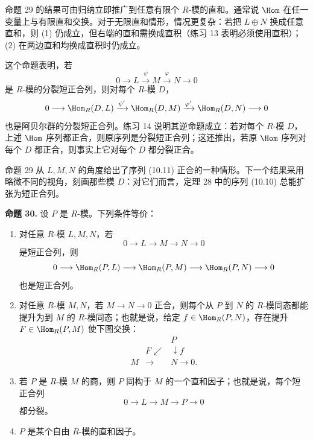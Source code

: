 命题 29 的结果可由归纳立即推广到任意有限个 $R$-模的直和。通常说 $\Hom$ 在任一变量上与有限直和交换。对于无限直和情形，情况更复杂：若把 $L\oplus N$ 换成任意直和，则 (1) 仍成立，但右端的直和需换成直积（练习 13 表明必须使用直积）；(2) 在两边直和均换成直积时仍成立。

这个命题表明，若
\[
0\longrightarrow L\xrightarrow{\psi}M\xrightarrow{\varphi}N\longrightarrow0
\]
是 $R$-模的分裂短正合列，则对每个 $R$-模 $D$，
\[
0\longrightarrow\Hom_R(D,L)\xrightarrow{\psi'}\Hom_R(D,M)\xrightarrow{\varphi'}\Hom_R(D,N)\longrightarrow0
\]
也是阿贝尔群的分裂短正合列。练习 14 说明其逆命题成立：若对每个 $R$-模 $D$，上述 $\Hom$ 序列都正合，则原序列是分裂短正合列；这还推出，若原 $\Hom$ 序列对每个 $D$ 都正合，则事实上它对每个 $D$ 都分裂正合。

命题 29 从 $L,M,N$ 的角度给出了序列 (10.11) 正合的一种情形。下一个结果采用略微不同的视角，刻画那些模 $D$：对它们而言，定理 28 中的序列 (10.10) 总能扩张为短正合列。

\noindent\textbf{命题 30.} 设 $P$ 是 $R$-模。下列条件等价：
\begin{enumerate}[label=(\arabic*)]
\item 对任意 $R$-模 $L,M,N$，若
\[
0\longrightarrow L\longrightarrow M\longrightarrow N\longrightarrow0
\]
是短正合列，则
\[
0\longrightarrow\Hom_R(P,L)\longrightarrow\Hom_R(P,M)\longrightarrow\Hom_R(P,N)\longrightarrow0
\]
也是短正合列。
\item 对任意 $R$-模 $M,N$，若 $M\to N\to0$ 正合，则每个从 $P$ 到 $N$ 的 $R$-模同态都能提升为到 $M$ 的 $R$-模同态；也就是说，给定 $f\in\Hom_R(P,N)$，存在提升 $F\in\Hom_R(P,M)$ 使下图交换：
\[
\begin{array}{ccc}
&&P\\
&F\swarrow&\downarrow f\\[-1mm]
M&\longrightarrow&N\longrightarrow0.
\end{array}
\]
\item 若 $P$ 是 $R$-模 $M$ 的商，则 $P$ 同构于 $M$ 的一个直和因子；也就是说，每个短正合列
\[
0\longrightarrow L\longrightarrow M\longrightarrow P\longrightarrow0
\]
都分裂。
\item $P$ 是某个自由 $R$-模的直和因子。
\end{enumerate}


